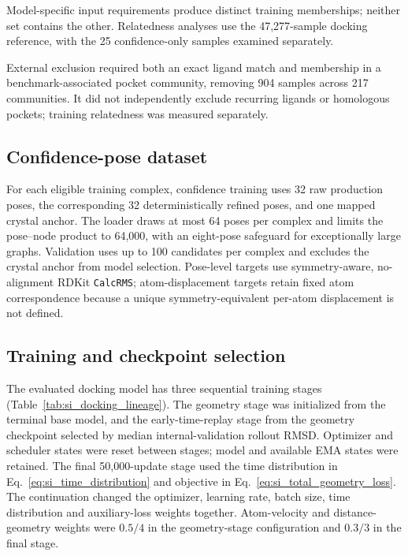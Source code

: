 \documentclass{article}
\begin{document}
Model-specific input requirements produce distinct training memberships; neither set contains the other. Relatedness analyses use the 47,277-sample docking reference, with the 25 confidence-only samples examined separately.

External exclusion required both an exact ligand match and membership in a benchmark-associated pocket community, removing 904 samples across 217 communities. It did not independently exclude recurring ligands or homologous pockets; training relatedness was measured separately.

\subsection{Confidence-pose dataset}
\label{si:confidence_corpus}

For each eligible training complex, confidence training uses 32 raw production poses, the corresponding 32 deterministically refined poses, and one mapped crystal anchor.
The loader draws at most 64 poses per complex and limits the pose--node product to 64,000, with an eight-pose safeguard for exceptionally large graphs.
Validation uses up to 100 candidates per complex and excludes the crystal anchor from model selection.
Pose-level targets use symmetry-aware, no-alignment RDKit \texttt{CalcRMS}; atom-displacement targets retain fixed atom correspondence because a unique symmetry-equivalent per-atom displacement is not defined.

\subsection{Training and checkpoint selection}
\label{si:runtime_provenance}

The evaluated docking model has three sequential training stages (Table~\ref{tab:si_docking_lineage}). The geometry stage was initialized from the terminal base model, and the early-time-replay stage from the geometry checkpoint selected by median internal-validation rollout RMSD. Optimizer and scheduler states were reset between stages; model and available EMA states were retained. The final 50,000-update stage used the time distribution in Eq.~\eqref{eq:si_time_distribution} and objective in Eq.~\eqref{eq:si_total_geometry_loss}. The continuation changed the optimizer, learning rate, batch size, time distribution and auxiliary-loss weights together. Atom-velocity and distance-geometry weights were \(0.5/4\) in the geometry-stage configuration and \(0.3/3\) in the final stage.
\end{document}
